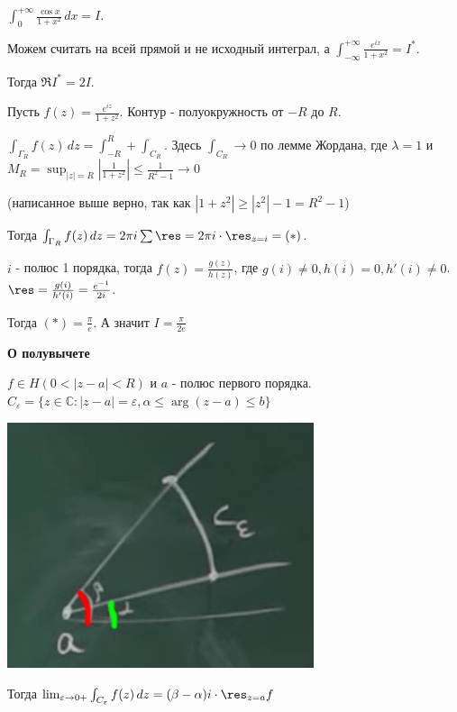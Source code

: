 \begin{example}
    $\int_0^{+\infty} \frac{\cos x}{1 + x^2} \, dx = I$.

    Можем считать на всей прямой и не исходный интеграл, а $\int_{-\infty}^{+\infty} \frac{e^{ix}}{1 + x^2} = I^*$.

    Тогда $\Re I^* = 2I$.

    Пусть $f(z) = \frac{e^{iz}}{1 + z^2}$. Контур - полуокружность от $-R$ до $R$.

    $\int_{\Gamma_R} f(z) \, dz = \int_{-R}^{R} + \int_{C_R}$. Здесь $\int_{C_R} \rightarrow 0$ по лемме
    Жордана, где $\lambda = 1$ и $M_R = \sup_{|z| = R} \left | \frac{1}{1 + z^2} \right | \leqslant \frac{1}{R^2 - 1} \rightarrow 0$

    (написанное выше верно, так как $|1 + z^2| \geqslant |z^2| - 1 = R^2 - 1$)

    Тогда $\int_{\Gamma_R} f(z) \, dz = 2 \pi i \sum \res = 2 \pi i \cdot \res_{z = i} = (*)$.

    $i$ - полюс 1 порядка, тогда $f(z) = \frac{g(z)}{h(z)}$, где $g(i) \neq 0, h(i) = 0, h'(i) \neq 0$. $
    \res = \frac{g(i)}{h'(i)} = \frac{e^{-1}}{2i}$.

    Тогда $(*) = \frac{\pi}{e}$. А значит $I = \frac{\pi}{2e}$
    
\end{example}

\begin{lemma}
    \textbf{О полувычете}

    $f \in H(0 < |z - a| < R)$ и $a$ - полюс первого порядка. $C_{\varepsilon} = \{ z \in \mathbb{C} : |z - a| = \varepsilon, \alpha \leqslant \arg (z - a) \leqslant b \}$

    \begin{center}
        \includegraphics[width=9cm]{assets/04-functions-of-complex-variables/lemma-about-half-deduction.png}
    \end{center}

    Тогда $\lim_{\varepsilon \to 0+} \int_{C_{\varepsilon}} f(z) \, dz = (\beta - \alpha) i \cdot \res_{z = a} f$
\end{lemma}

